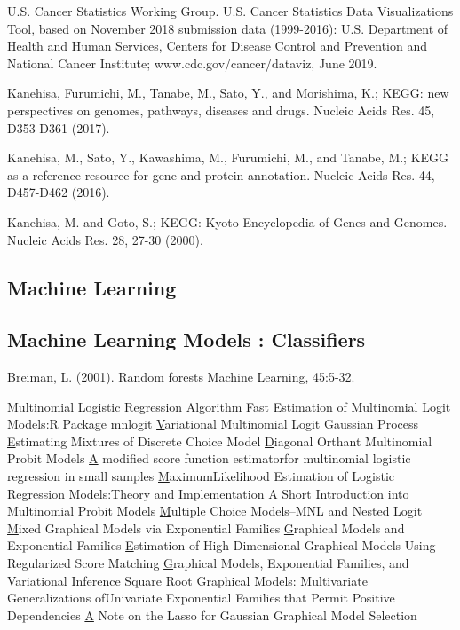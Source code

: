 
\begin{thebibliography}{00}

U.S. Cancer Statistics Working Group. U.S. Cancer Statistics Data Visualizations Tool, based on November 2018 submission data (1999-2016): 
\newblock U.S. Department of Health and Human Services, Centers for Disease Control and Prevention and National Cancer Institute; 
\newblock www.cdc.gov/cancer/dataviz, June 2019.

 Kanehisa, Furumichi, M., Tanabe, M., Sato, Y., and Morishima, K.; 
\newblock KEGG: new perspectives on genomes, pathways, diseases and drugs. 
\newblock Nucleic Acids Res. 45, D353-D361 (2017).

 Kanehisa, M., Sato, Y., Kawashima, M., Furumichi, M., and Tanabe, M.; 
\newblock KEGG as a reference resource for gene and protein annotation. 
\newblock Nucleic Acids Res. 44, D457-D462 (2016).

 Kanehisa, M. and Goto, S.; 
\newblock KEGG: Kyoto Encyclopedia of Genes and Genomes. 
\newblock Nucleic Acids Res. 28, 27-30 (2000). 

\subsection{Machine Learning}

\subsection{Machine Learning Models : Classifiers}
Breiman, L. (2001). 
\newblock Random forests
\newblock Machine Learning, 45:5-32.

\href{}Multinomial Logistic Regression Algorithm
\href{}Fast Estimation of Multinomial Logit Models:R Package mnlogit
\href{}Variational Multinomial Logit Gaussian Process
\href{}Estimating Mixtures of Discrete Choice Model
\href{}Diagonal Orthant Multinomial Probit Models
\href{}A modified score function estimatorfor multinomial logistic regression in small samples
\href{}MaximumLikelihood Estimation of Logistic Regression Models:Theory and Implementation
\href{}A Short Introduction into Multinomial Probit Models
\href{}Multiple Choice Models--MNL and Nested Logit
\href{}Mixed Graphical Models via Exponential Families
\href{}Graphical Models and Exponential Families
\href{}Estimation of High-Dimensional Graphical Models Using Regularized Score Matching
\href{}Graphical Models, Exponential Families, and Variational Inference
\href{}Square Root Graphical Models: Multivariate Generalizations ofUnivariate Exponential Families that Permit Positive Dependencies
\href{}A Note on the Lasso for Gaussian Graphical Model Selection


\end{thebibliography}
